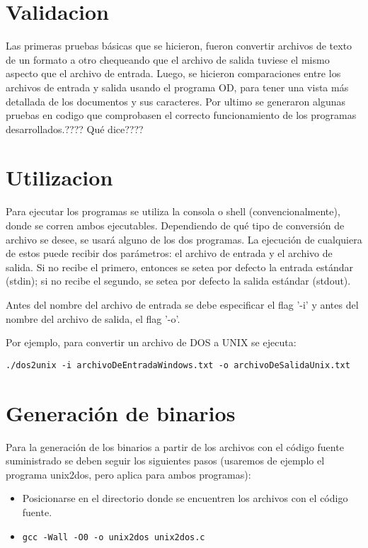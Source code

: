 \documentclass[a4paper,11pt]{article}
\begin{document}
\section{Validacion}
Las primeras pruebas básicas que se hicieron, fueron convertir archivos de texto de un formato a otro chequeando que el archivo de salida tuviese el mismo aspecto que el archivo de entrada. Luego, se hicieron comparaciones entre los archivos de entrada y salida usando el programa OD, para tener una vista más detallada de los documentos y sus caracteres. Por ultimo se generaron algunas pruebas en codigo que comprobasen el correcto funcionamiento de los programas desarrollados.???? Qué dice????


\section{Utilizacion}
Para ejecutar los programas se utiliza la consola o shell (convencionalmente), donde se corren ambos ejecutables. Dependiendo de qué tipo de conversión de archivo se desee, se usará alguno de los dos programas. La ejecución de cualquiera de estos puede recibir dos parámetros: el archivo de entrada y el archivo de salida. Si no recibe el primero, entonces se setea por defecto la entrada estándar (stdin); si no recibe el segundo, se setea por defecto la salida estándar (stdout).

\indent	
Antes del nombre del archivo de entrada se debe especificar el flag '-i' y antes del nombre del archivo de salida, el flag '-o'.

\indent	
Por ejemplo, para convertir un archivo de DOS a UNIX se ejecuta: 

\begin{verbatim}
./dos2unix -i archivoDeEntradaWindows.txt -o archivoDeSalidaUnix.txt
\end{verbatim}

\section{Generaci\'on de binarios}
Para la generaci\'on de los binarios a partir de los archivos con el c\'odigo fuente suministrado se deben seguir los siguientes pasos (usaremos de ejemplo el programa unix2dos, pero aplica para ambos programas):

\begin{itemize}
\item Posicionarse en el directorio donde se encuentren los archivos con el c\'odigo fuente.
\item \begin{verbatim}
gcc -Wall -O0 -o unix2dos unix2dos.c
\end{verbatim} 
\end{itemize}
\end{document}

